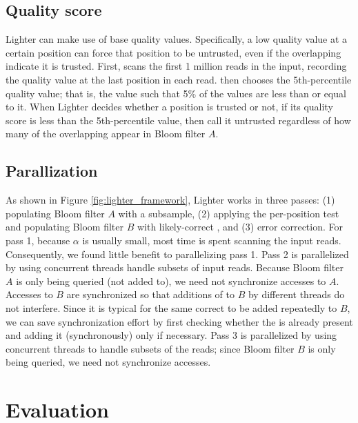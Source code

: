 \documentclass[10pt]{article}
\begin{document}

\subsection*{Quality score}
Lighter can make use of base quality values.  Specifically, a low quality value at a certain position can force that position to be untrusted, even if the overlapping \kmers indicate it is trusted.  First, \tool scans the first 1 million reads in the input, recording the quality value at the last position in each read.  \tool then chooses the 5th-percentile quality value; that is, the value such that 5\% of the values are less than or equal to it.  When Lighter decides whether a position is trusted or not, if its quality score is less than the 5th-percentile value, then call it untrusted regardless of how many of the overlapping \kmers appear in Bloom filter $A$.

\subsection*{Parallization} 
As shown in Figure \ref{fig:lighter_framework}, Lighter works in three passes: (1) populating Bloom filter $A$ with a \kmer subsample, (2) applying the per-position test and populating Bloom filter $B$ with likely-correct \kmers, and (3) error correction.  For pass 1, because $\alpha$ is usually small, most time is spent scanning the input reads.  Consequently, we found little benefit to parallelizing pass 1.  Pass 2 is parallelized by using concurrent threads handle subsets of input reads.  Because Bloom filter $A$ is only being queried (not added to), we need not synchronize accesses to $A$.  Accesses to $B$ are synchronized so that additions of \kmers to $B$ by different threads do not interfere.  Since it is typical for the same correct \kmer to be added repeatedly to $B$, we can save synchronization effort by first checking whether the \kmer is already present and adding it (synchronously) only if necessary.  Pass 3 is parallelized by using concurrent threads to handle subsets of the reads; since Bloom filter $B$ is only being queried, we need not synchronize accesses.

\section*{Evaluation}
\end{document}
